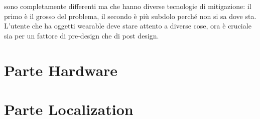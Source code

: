 \documentclass[oneside, 12pt]{extbook}
\begin{document}
sono completamente differenti ma che hanno diverse tecnologie di mitigazione: il primo è il grosso del problema, il secondo è più subdolo perché non si sa dove sta.\\L'utente che ha oggetti wearable deve stare attento  a diverse cose, ora è cruciale sia per un fattore di pre-design che di post design.


\part{Parte Hardware}



\part{Parte Localization}
\end{document}
